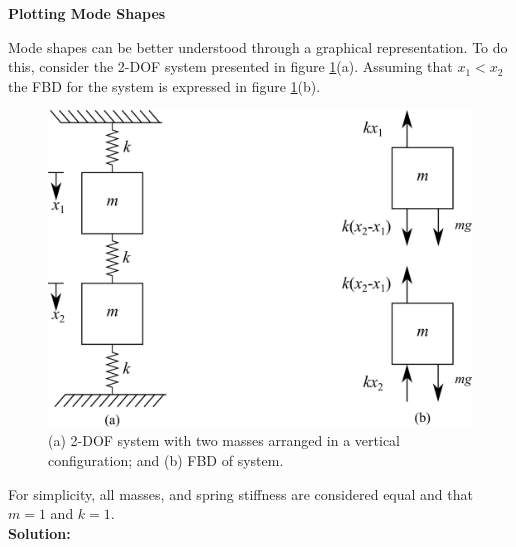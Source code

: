 \documentclass[12pt,letter]{article}
\begin{document}
	\begin{example}

	\textbf{Plotting Mode Shapes}

	\noindent Mode shapes can be better understood through a graphical representation. To do this, consider the 2-DOF system presented in figure \ref{fig:2-DOF-spring_mass_vertical}(a). Assuming that $x_1<x_2$ the FBD for the system is expressed in figure \ref{fig:2-DOF-spring_mass_vertical}(b).
	
	\begin{figure}[H]
		\centering
		\includegraphics[]{../figures/2-DOF-spring_mass_vertical_with_FBD.png}
		\caption{(a) 2-DOF system with two masses arranged in a vertical configuration; and (b) FBD of system.}
		\label{fig:2-DOF-spring_mass_vertical}
	\end{figure}
	\noindent For simplicity, all masses, and spring stiffness are considered equal and that $m=1$ and $k=1$. \\

	\noindent \textbf{Solution:} 


\end{example}
\end{document}
